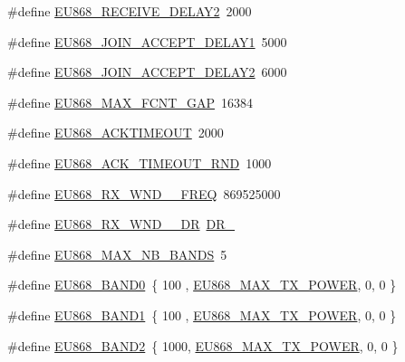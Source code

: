 \begin{DoxyCompactItemize}
\#define \hyperlink{group__REGIONEU868_ga5b1785ed0935234e288f90a0461cd04b}{E\+U868\+\_\+\+R\+E\+C\+E\+I\+V\+E\+\_\+\+D\+E\+L\+A\+Y2}~2000
\item 
\#define \hyperlink{group__REGIONEU868_gac37947128c2721653a6da84362c04f8c}{E\+U868\+\_\+\+J\+O\+I\+N\+\_\+\+A\+C\+C\+E\+P\+T\+\_\+\+D\+E\+L\+A\+Y1}~5000
\item 
\#define \hyperlink{group__REGIONEU868_ga4b26a2e21778e0a790ab45637fb8f51f}{E\+U868\+\_\+\+J\+O\+I\+N\+\_\+\+A\+C\+C\+E\+P\+T\+\_\+\+D\+E\+L\+A\+Y2}~6000
\item 
\#define \hyperlink{group__REGIONEU868_ga82b9bba1cf3046bb808448af3a3851a6}{E\+U868\+\_\+\+M\+A\+X\+\_\+\+F\+C\+N\+T\+\_\+\+G\+AP}~16384
\item 
\#define \hyperlink{group__REGIONEU868_ga0d482880b3686526074336cc53d3a711}{E\+U868\+\_\+\+A\+C\+K\+T\+I\+M\+E\+O\+UT}~2000
\item 
\#define \hyperlink{group__REGIONEU868_gaf263a9c127c374ca28a18dee1f63dcf4}{E\+U868\+\_\+\+A\+C\+K\+\_\+\+T\+I\+M\+E\+O\+U\+T\+\_\+\+R\+ND}~1000
\item 
\#define \hyperlink{group__REGIONEU868_ga6cc4e22e8e2b73a7e1789ff22b6d4d76}{E\+U868\+\_\+\+R\+X\+\_\+\+W\+N\+D\+\_\+\_\+\+F\+R\+EQ}~869525000
\item 
\#define \hyperlink{group__REGIONEU868_ga291302a83db2690d26b2659853262abe}{E\+U868\+\_\+\+R\+X\+\_\+\+W\+N\+D\+\_\+\_\+\+DR}~\hyperlink{group__REGION_ga6c4ef966b4f3d5eb7597b087f2b97095}{D\+R\+\_}
\item 
\#define \hyperlink{group__REGIONEU868_gac5749114ab11499796ef455491fe8997}{E\+U868\+\_\+\+M\+A\+X\+\_\+\+N\+B\+\_\+\+B\+A\+N\+DS}~5
\item 
\#define \hyperlink{group__REGIONEU868_gadf9e5ce0c5061df64ab9105bba178fb5}{E\+U868\+\_\+\+B\+A\+N\+D0}~\{ 100 , \hyperlink{group__REGIONEU868_ga39e338c7f8454f594302811f61d9560d}{E\+U868\+\_\+\+M\+A\+X\+\_\+\+T\+X\+\_\+\+P\+O\+W\+ER}, 0,  0 \}
\item 
\#define \hyperlink{group__REGIONEU868_ga8a18e253f46e534ff0ee00c0c21b4211}{E\+U868\+\_\+\+B\+A\+N\+D1}~\{ 100 , \hyperlink{group__REGIONEU868_ga39e338c7f8454f594302811f61d9560d}{E\+U868\+\_\+\+M\+A\+X\+\_\+\+T\+X\+\_\+\+P\+O\+W\+ER}, 0,  0 \}
\item 
\#define \hyperlink{group__REGIONEU868_gaf5b8aba834ede7487acbff80b6c30b36}{E\+U868\+\_\+\+B\+A\+N\+D2}~\{ 1000, \hyperlink{group__REGIONEU868_ga39e338c7f8454f594302811f61d9560d}{E\+U868\+\_\+\+M\+A\+X\+\_\+\+T\+X\+\_\+\+P\+O\+W\+ER}, 0,  0 \}
\item 

\end{DoxyCompactItemize}
